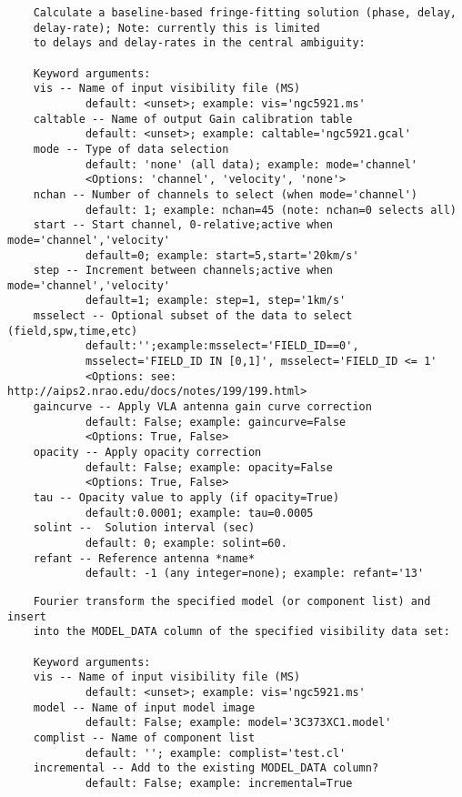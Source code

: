 \vspace{3mm}
\small
\begin{verbatim}
    Calculate a baseline-based fringe-fitting solution (phase, delay,
    delay-rate); Note: currently this is limited  
    to delays and delay-rates in the central ambiguity:
    
    Keyword arguments:
    vis -- Name of input visibility file (MS)
            default: <unset>; example: vis='ngc5921.ms'
    caltable -- Name of output Gain calibration table
            default: <unset>; example: caltable='ngc5921.gcal'
    mode -- Type of data selection
            default: 'none' (all data); example: mode='channel'
            <Options: 'channel', 'velocity', 'none'>
    nchan -- Number of channels to select (when mode='channel')
            default: 1; example: nchan=45 (note: nchan=0 selects all)
    start -- Start channel, 0-relative;active when mode='channel','velocity'
            default=0; example: start=5,start='20km/s'
    step -- Increment between channels;active when mode='channel','velocity'
            default=1; example: step=1, step='1km/s'
    msselect -- Optional subset of the data to select (field,spw,time,etc)
            default:'';example:msselect='FIELD_ID==0', 
            msselect='FIELD_ID IN [0,1]', msselect='FIELD_ID <= 1'
            <Options: see: http://aips2.nrao.edu/docs/notes/199/199.html>
    gaincurve -- Apply VLA antenna gain curve correction
            default: False; example: gaincurve=False
            <Options: True, False>
    opacity -- Apply opacity correction
            default: False; example: opacity=False
            <Options: True, False>
    tau -- Opacity value to apply (if opacity=True)
            default:0.0001; example: tau=0.0005
    solint --  Solution interval (sec)
            default: 0; example: solint=60.
    refant -- Reference antenna *name*
            default: -1 (any integer=none); example: refant='13'
\end{verbatim}
\normalsize

\vspace{3mm}
\small
\begin{verbatim}
    Fourier transform the specified model (or component list) and insert
    into the MODEL_DATA column of the specified visibility data set:  
    
    Keyword arguments:
    vis -- Name of input visibility file (MS)
            default: <unset>; example: vis='ngc5921.ms'
    model -- Name of input model image
            default: False; example: model='3C373XC1.model'
    complist -- Name of component list
            default: ''; example: complist='test.cl'
    incremental -- Add to the existing MODEL_DATA column?
            default: False; example: incremental=True
\end{verbatim}
\normalsize

